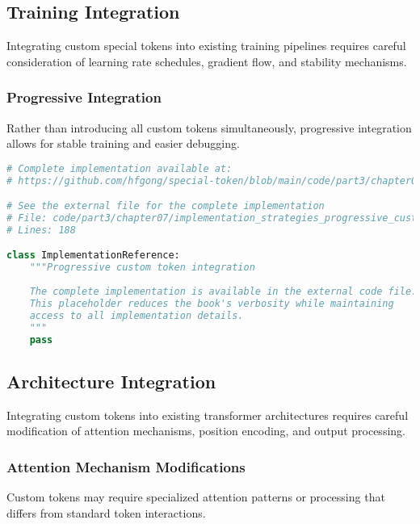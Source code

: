 \subsection{Training Integration}

Integrating custom special tokens into existing training pipelines requires careful consideration of learning rate schedules, gradient flow, and stability mechanisms.

\subsubsection{Progressive Integration}

Rather than introducing all custom tokens simultaneously, progressive integration allows for stable training and easier debugging.

\begin{lstlisting}[language=Python, caption={Progressive custom token integration}]
# Complete implementation available at:
# https://github.com/hfgong/special-token/blob/main/code/part3/chapter07/implementation_strategies_progressive_custom_token_integ.py

# See the external file for the complete implementation
# File: code/part3/chapter07/implementation_strategies_progressive_custom_token_integ.py
# Lines: 188

class ImplementationReference:
    """Progressive custom token integration
    
    The complete implementation is available in the external code file.
    This placeholder reduces the book's verbosity while maintaining
    access to all implementation details.
    """
    pass
\end{lstlisting}

\subsection{Architecture Integration}

Integrating custom tokens into existing transformer architectures requires careful modification of attention mechanisms, position encoding, and output processing.

\subsubsection{Attention Mechanism Modifications}

Custom tokens may require specialized attention patterns or processing that differs from standard token interactions.

